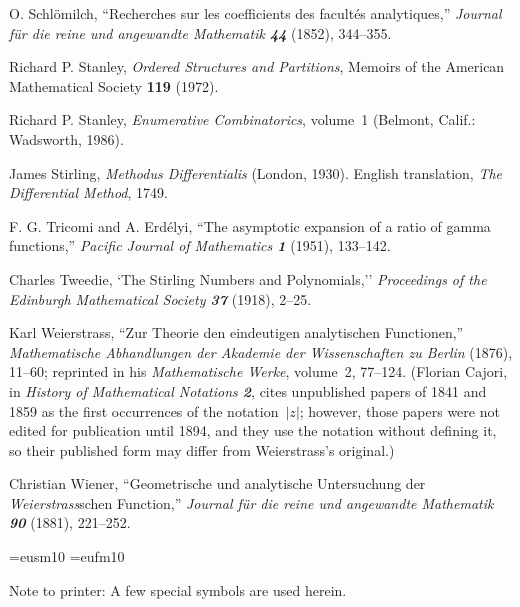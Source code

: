 \bib
[49]\enspace
O. Schl\"omilch, ``Recherches sur les coefficients des facult\'es
analytiques,''
{\sl Journal f\"ur die reine und angewandte Mathematik\/
\bf 44} (1852), 344--355.

\bib
[50]\enspace
Richard P. Stanley, {\sl Ordered Structures and Partitions}, Memoirs
of the American Mathematical Society {\bf 119} (1972).

\bib
[51]\enspace
Richard P. Stanley, {\sl Enumerative Combinatorics}, volume~1
(Belmont, Calif.: Wadsworth, 1986).

\bib
[52]\enspace
James Stirling, {\sl Methodus Differentialis\/} (London, 1930).
English translation, {\sl The Differential Method}, 1749.

\bib
[53]\enspace
F. G. Tricomi and A. Erd\'elyi, ``The asymptotic expansion of a ratio
of gamma functions,'' {\sl Pacific Journal of Mathematics\/ \bf 1}
(1951), 133--142.

\bib
[54]\enspace
Charles Tweedie, `The Stirling Numbers and Polynomials,'' {\sl
Proceedings of the Edinburgh Mathematical Society\/ \bf 37} (1918), 2--25.

\bib
[55]\enspace
Karl Weierstrass, ``Zur Theorie den eindeutigen analytischen
Functionen,''
{\sl Mathematische Abhandlungen der Akademie der Wissenschaften zu
Berlin\/} (1876), 11--60; reprinted in his {\sl Mathematische Werke},
volume~2, 77--124. (Florian Cajori, in {\sl History of Mathematical
Notations\/ \bf 2}, cites unpublished papers of 1841 and 1859 as the
first occurrences of the notation~$\vert z\vert$; however, those
papers were not edited for publication until 1894, and they use the
notation without defining it, so their published form may differ from
Weierstrass's original.)

\bib
[56] \enspace
Christian Wiener, ``Geometrische und analytische Untersuchung der
{\it Weierstrass\/}schen Function,'' 
{\sl Journal f\"ur die reine und angewandte Mathematik\/
\bf 90} (1881), 221--252.

\vfill\eject

\def\nopagenumber{}
\nopagenumber

\font\eusm=eusm10
\font\eufr=eufm10

\noindent
Note to printer: A few special symbols are used herein.

\bigskip
{}


\bye
